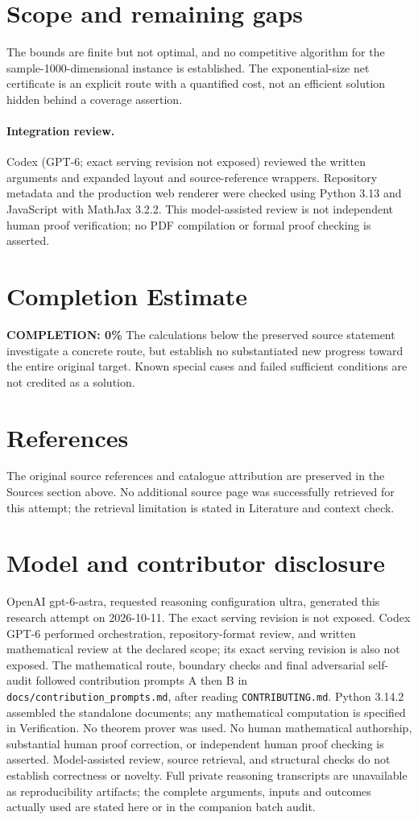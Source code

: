 \documentclass[11pt]{article}
\begin{document}
\section{Scope and remaining gaps}
The bounds are finite but not optimal, and no competitive algorithm for the sample-1000-dimensional instance is established. The exponential-size net certificate is an explicit route with a quantified cost, not an efficient solution hidden behind a coverage assertion.
\paragraph{Integration review.} Codex (GPT-6; exact serving revision not exposed) reviewed the written arguments and expanded layout and source-reference wrappers. Repository metadata and the production web renderer were checked using Python 3.13 and JavaScript with MathJax 3.2.2. This model-assisted review is not independent human proof verification; no PDF compilation or formal proof checking is asserted.

\section{Completion Estimate}
\noindent\textbf{COMPLETION: 0\%}
The calculations below the preserved source statement investigate a concrete route,
but establish no substantiated new progress toward the entire original target.
Known special cases and failed sufficient conditions are not credited as a solution.
\section{References}
The original source references and catalogue attribution are preserved in the
Sources section above. No additional source page was successfully retrieved for
this attempt; the retrieval limitation is stated in Literature and context check.
\section{Model and contributor disclosure}
OpenAI gpt-6-astra, requested reasoning configuration ultra, generated this research
attempt on 2026-10-11. The exact serving revision is not exposed. Codex GPT-6
performed orchestration, repository-format review, and written mathematical review at the declared scope; its exact serving revision
is also not exposed. The mathematical route, boundary checks and final adversarial
self-audit followed contribution prompts A then B in
\texttt{docs/contribution\_prompts.md}, after reading \texttt{CONTRIBUTING.md}.
Python 3.14.2 assembled the standalone documents; any mathematical computation is
specified in Verification. No theorem prover was used. No human mathematical
authorship, substantial human proof correction, or independent human proof checking
is asserted. Model-assisted review, source retrieval, and structural checks do not
establish correctness or novelty. Full private reasoning transcripts are unavailable
as reproducibility artifacts; the complete arguments, inputs and outcomes actually
used are stated here or in the companion batch audit.
\end{document}
